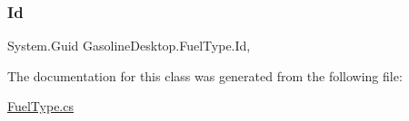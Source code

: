 \subsubsection{\texorpdfstring{Id}{Id}}
{\footnotesize\ttfamily System.\+Guid Gasoline\+Desktop.\+Fuel\+Type.\+Id\hspace{0.3cm}{\ttfamily [get]}, {\ttfamily [set]}}



The documentation for this class was generated from the following file\+:\begin{DoxyCompactItemize}
\item 
\mbox{\hyperlink{_fuel_type_8cs}{Fuel\+Type.\+cs}}\end{DoxyCompactItemize}
